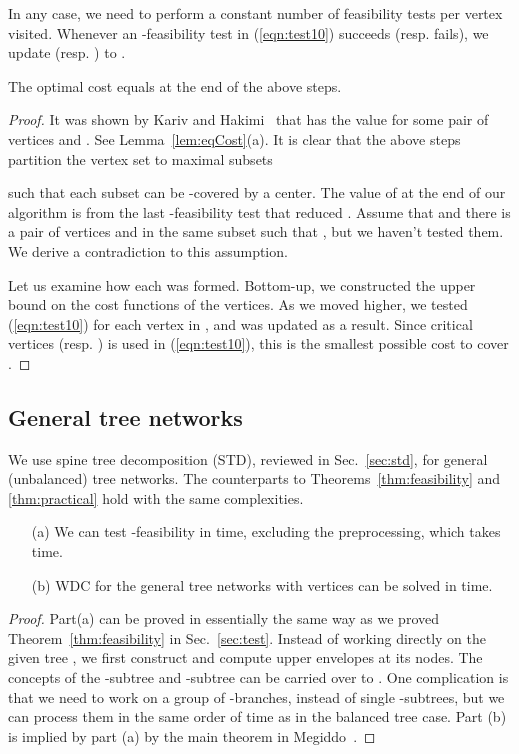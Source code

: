 \documentclass{llncs}
\newcommand{\QED}{\hfill}
\begin{document}
{In any case, we need to perform a constant number of feasibility tests per vertex visited.
Whenever an -feasibility test in (\ref{eqn:test10})
succeeds (resp. fails),
we update  (resp. ) to .
\begin{lemma} \label{lem:finalAlpha}
The optimal cost  equals  at the end of the above steps.
\end{lemma}
\begin{proof}
It was shown by Kariv and Hakimi~\cite{kariv1979b} that  has the value
 for some pair of vertices  and .
See Lemma~\ref{lem:eqCost}(a). 
It is clear that the above steps partition the vertex set to  maximal subsets

such that each subset  can be -covered by a center.
The value of  at the end of our algorithm is
from the last -feasibility test that reduced .
Assume that  and there is a pair of
vertices  and  in the same subset such that  ,
but we haven't tested them. 
We derive a contradiction to this assumption.

Let us examine how each  was formed.
Bottom-up, we constructed the upper bound on the cost functions of the vertices.
As we moved higher, we tested (\ref{eqn:test10}) for each vertex  in ,
and  was updated as a result.
Since critical vertices  (resp. ) is used in
(\ref{eqn:test10}), this  is the smallest possible cost to cover .
 \QED
\end{proof}




\subsection{General tree networks}\label{sec:general}
We use spine tree decomposition (STD),
reviewed in Sec.~\ref{sec:std},
 for general (unbalanced) tree networks.
The counterparts to Theorems~\ref{thm:feasibility} and \ref{thm:practical} hold
with the same complexities.
\begin{theorem}\label{thm:general1}
\begin{enumerate}
\item[(a)]
We can test -feasibility in  time,
excluding the preprocessing,
which takes  time.
\item[(b)]
WDC for the general tree networks with  vertices can be solved in 
  time.
\end{enumerate}
\end{theorem}
\begin{proof}
Part(a) can be proved in essentially the same way
as we proved Theorem~\ref{thm:feasibility} in Sec.~\ref{sec:test}.
Instead of working directly on the given tree ,
we first construct  and compute upper envelopes at its nodes.
The concepts of the -subtree and -subtree can be carried
over to .
One complication is that we need to work on a group of -branches,
instead of single -subtrees,
but we can process them in the same order of time as in the balanced tree case.
Part (b) is implied by part (a) by the main theorem in Megiddo~\cite{megiddo1979}.
\QED
\end{proof}

}
\end{document}
